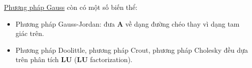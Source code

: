 \documentclass[../../Lectures]{subfiles}
\begin{document}
\hyperref[method:gauss_elimination]{Phương pháp Gauss} còn có một số biến thể:

\begin{itemize}
    \item Phương pháp Gauss-Jordan: đưa \(\bm{A}\) về dạng đường chéo thay vì
        dạng tam giác trên.

    \item Phương pháp Doolittle, phương pháp Crout, phương pháp Cholesky đều dựa
        trên phân tích \(\bm{LU}\) (\(\bm{LU}\) factorization).
\end{itemize}
\end{document}
